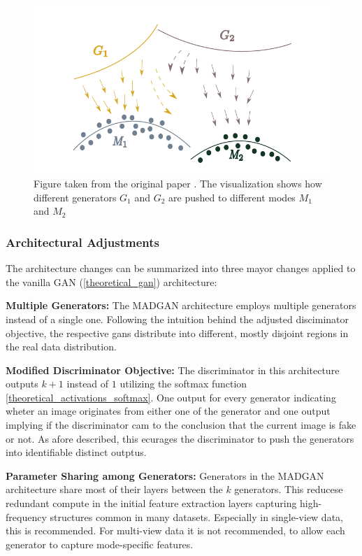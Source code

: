 \begin{figure}[htbp]
    \centering
    \includegraphics[width=.9\textwidth]{abb/madgan_diverse_mode_push.PNG}
    \caption{Figure taken from the original paper \cite{ghosh2018madgan}. The visualization shows how different generators \(G_1\) and \(G_2\) are pushed to different modes \(M_1\) and \(M_2\)}
    \label{fig:figure_madgan_diverse_mode_push}
\end{figure}

\subsubsection{Architectural Adjustments}
\label{theory_madgan_architecture}
The architecture changes can be summarized into three mayor changes applied to the vanilla GAN (\ref{theoretical_gan}) architecture:

\noindent\textbf{Multiple Generators:} The MADGAN architecture employs multiple generators instead of a single one. Following the intuition behind the adjusted disciminator objective, the respective gans distribute into different, mostly disjoint regions in the real data distribution.

\noindent\textbf{Modified Discriminator Objective:} The discriminator in this architecture outputs \(k + 1\) instead of \(1\) utilizing the softmax function \ref{theoretical_activations_softmax}. One output for every generator indicating wheter an image originates from either one of the generator and one output implying if the discriminator cam to the conclusion that the current image is fake or not. As afore described, this ecurages the discriminator to push the generators into identifiable distinct outptus.

\noindent\textbf{Parameter Sharing among Generators:} Generators in the MADGAN architecture share most of their layers between the \(k\) generators. This reducese redundant compute in the initial feature extraction layers capturing high-frequency structures common in many datasets. Especially in single-view data, this is recommended. For multi-view data it is not recommended, to allow each generator to capture mode-specific features.

